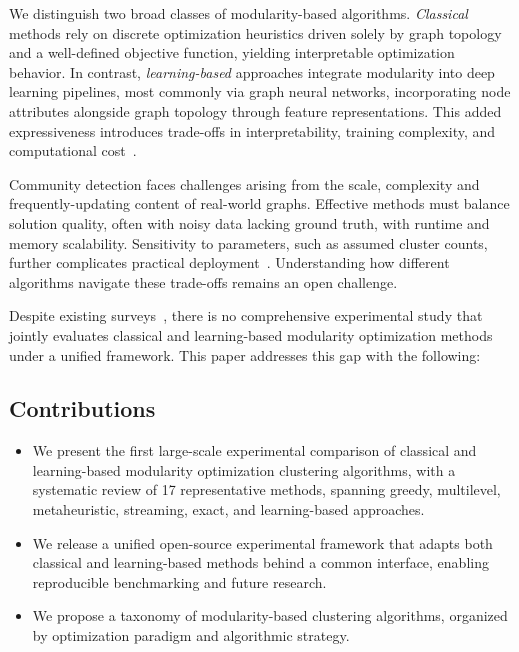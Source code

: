 \documentclass[../paper.tex]{subfiles}
\begin{document}
We distinguish two broad classes of modularity-based algorithms. \emph{Classical} methods rely on discrete optimization heuristics driven solely by graph topology and a well-defined objective function, yielding interpretable optimization behavior. In contrast, \emph{learning-based} approaches integrate modularity into deep learning pipelines, most commonly via graph neural networks, incorporating node attributes alongside graph topology through feature representations. This added expressiveness introduces trade-offs in interpretability, training complexity, and computational cost~\cite{neuromap2024}.

Community detection faces challenges arising from the scale, complexity and frequently-updating content of real-world graphs. Effective methods must balance solution quality, often with noisy data lacking ground truth, with runtime and memory scalability. Sensitivity to parameters, such as assumed cluster counts, further complicates practical deployment~\cite{Wani2024}. Understanding how different algorithms navigate these trade-offs remains an open challenge.

Despite existing surveys~\cite{Liu2020, Jin2023, survey2023, Li2024, liang2024, Wani2024, Messias2025}, there is no comprehensive experimental study that jointly evaluates classical and learning-based modularity optimization methods under a unified framework. This paper addresses this gap with the following:


\subsection*{Contributions}

\begin{itemize}
	\item We present the first large-scale experimental comparison of classical and learning-based modularity optimization clustering algorithms, with a systematic review of 17 representative methods, spanning greedy, multilevel, metaheuristic, streaming, exact, and learning-based approaches.
	\item We release a unified open-source experimental framework that adapts both classical and learning-based methods behind a common interface, enabling reproducible benchmarking and future research.
	\item We propose a taxonomy of modularity-based clustering algorithms, organized by optimization paradigm and algorithmic strategy.
	
\end{itemize}
\end{document}
